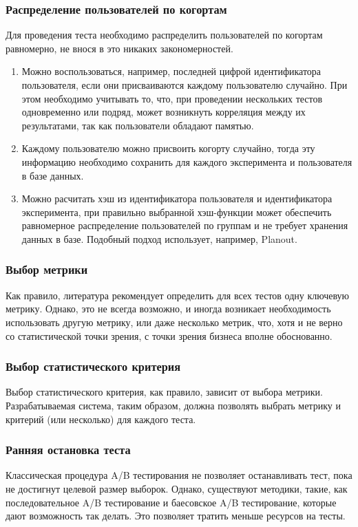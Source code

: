 \documentclass[../document.tex]{subfiles}
\begin{document}
    \subsubsection{Распределение пользователей по когортам}
    \par Для проведения теста необходимо распределить пользователей по когортам равномерно, не внося в это никаких закономерностей.
    \begin{enumerate}
        \item Можно воспользоваться, например, последней цифрой идентификатора пользователя, если они присваиваются каждому пользователю случайно. При этом необходимо учитывать то, что, при проведении нескольких тестов одновременно или подряд, может возникнуть корреляция между их результатами, так как пользователи обладают памятью.
        \item Каждому пользователю можно присвоить когорту случайно, тогда эту информацию необходимо сохранить для каждого эксперимента и пользователя в базе данных.
        \item Можно расчитать хэш из идентификатора пользователя и идентификатора эксперимента, при правильно выбранной хэш-функции может обеспечить равномерное распределение пользователей по группам и не требует хранения данных в базе. Подобный подход использует, например, Planout\cite{noauthor_planout_nodate}.
    \end{enumerate}
    \subsubsection{Выбор метрики}
    \par Как правило, литература\cite{kohavi_online_2013, sammut_online_2017} рекомендует определить для всех тестов одну ключевую метрику. Однако, это не всегда возможно, и иногда возникает необходимость использовать другую метрику, или даже несколько метрик, что, хотя и не верно со статистической точки зрения, с точки зрения бизнеса вполне обоснованно.
    \subsubsection{Выбор статистического критерия}
    \par Выбор статистического критерия, как правило, зависит от выбора метрики. Разрабатываемая система, таким образом, должна позволять выбрать метрику и критерий (или несколько) для каждого теста.
    \subsubsection{Ранняя остановка теста}
    \par Классическая процедура A/B тестирования не позволяет останавливать тест, пока не достигнут целевой размер выборок. Однако, существуют методики, такие, как последовательное A/B тестирование\cite{miller_simple_nodate} и баесовское A/B тестирование\cite{miller_formulas_nodate}, которые дают возможность так делать. Это позволяет тратить меньше ресурсов на тесты.
\end{document}
